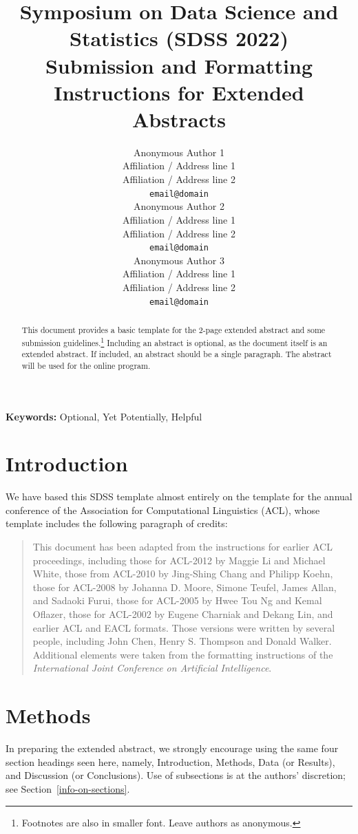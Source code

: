 \documentclass[10pt]{article}
\title{Symposium on Data Science and Statistics (SDSS 2022) \\
Submission and Formatting Instructions for Extended Abstracts}
\author{
  Anonymous Author 1 \\
  Affiliation / Address line 1 \\
  Affiliation / Address line 2 \\
  {\tt email@domain} \\\And
  Anonymous Author 2 \\
  Affiliation / Address line 1 \\
  Affiliation / Address line 2 \\
  {\tt email@domain} \\\And
  Anonymous Author 3 \\
  Affiliation / Address line 1 \\
  Affiliation / Address line 2 \\
  {\tt email@domain} \\}
\date{}
\begin{document}
\maketitle
\begin{abstract}
This document provides a basic template for the 2-page extended abstract
and some submission guidelines.\footnote{Footnotes are also in smaller font.  
Leave authors as anonymous.}
Including an abstract is optional, as the document itself is an extended abstract.
If included, an abstract should be a single paragraph. The abstract will be used for the online program.
\end{abstract}

{\bf Keywords:} Optional, Yet Potentially, Helpful

\section{Introduction}

We have based this SDSS template almost entirely on the template for
the annual conference of the Association for Computational Linguistics (ACL), whose
template includes the following paragraph of credits:
\begin{quotation}
\small %
This document has been adapted from the instructions for earlier ACL
proceedings, including those for ACL-2012 by Maggie Li and Michael
White, those from ACL-2010 by Jing-Shing Chang and Philipp Koehn,
those for ACL-2008 by Johanna D. Moore, Simone Teufel, James Allan,
and Sadaoki Furui, those for ACL-2005 by Hwee Tou Ng and Kemal
Oflazer, those for ACL-2002 by Eugene Charniak and Dekang Lin, and
earlier ACL and EACL formats. Those versions were written by several
people, including John Chen, Henry S. Thompson and Donald
Walker. Additional elements were taken from the formatting
instructions of the {\em International Joint Conference on Artificial
  Intelligence}.
\end{quotation}  

\section{Methods}

In preparing the extended abstract, 
we strongly encourage using the same four section headings seen here, namely, 
Introduction, Methods, Data (or Results), and Discussion (or Conclusions).
Use of subsections is at the authors' discretion; see Section~\ref{info-on-sections}.
\end{document}
